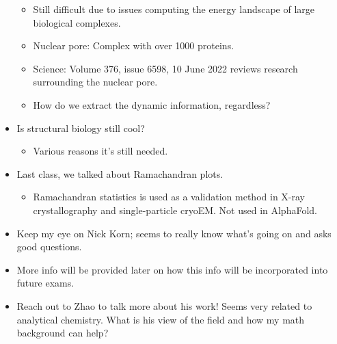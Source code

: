 \documentclass[../notes.tex]{subfiles}
\begin{document}
\begin{itemize}
    \begin{itemize}
        \item Still difficult due to issues computing the energy landscape of large biological complexes.
        \item Nuclear pore: Complex with over 1000 proteins.
        \item Science: Volume 376, issue 6598, 10 June 2022 reviews research surrounding the nuclear pore.
        \item How do we extract the dynamic information, regardless?
    \end{itemize}
    \item Is structural biology still cool?
    \begin{itemize}
        \item Various reasons it's still needed.
    \end{itemize}
    \item Last class, we talked about Ramachandran plots.
    \begin{itemize}
        \item Ramachandran statistics is used as a validation method in X-ray crystallography and single-particle cryoEM. Not used in AlphaFold.
    \end{itemize}
    \item Keep my eye on Nick Korn; seems to really know what's going on and asks good questions.
    \item More info will be provided later on how this info will be incorporated into future exams.
    \item Reach out to Zhao to talk more about his work! Seems very related to analytical chemistry. What is his view of the field and how my math background can help?
\end{itemize}
\end{document}
